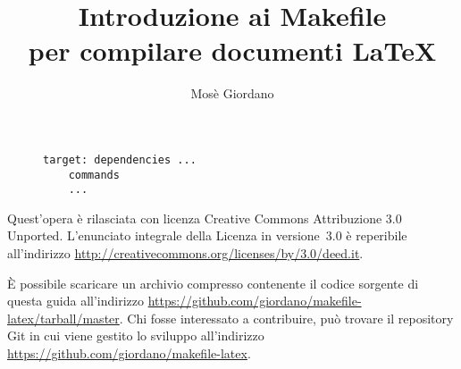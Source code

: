 \documentclass[a4paper]{article}
\title{Introduzione ai Makefile \\
  per compilare documenti \LaTeX}
\author{Mosè Giordano}
\begin{document}
\maketitle

\begin{figure}[h]
  \centering
  \begin{minipage}{0.48\linewidth}
\begin{lstlisting}
target: dependencies ...
	commands
	...
\end{lstlisting}
  \end{minipage}
\end{figure}

{\small \tableofcontents}







\printbibliography

\vfill

\noindent Quest'opera è rilasciata con licenza Creative Commons Attribuzione 3.0
Unported.  L'enunciato integrale della Licenza in versione~3.0 è reperibile
all'indirizzo \url{http://creativecommons.org/licenses/by/3.0/deed.it}.

È possibile scaricare un archivio compresso contenente il codice sorgente di
questa guida all'indirizzo
\url{https://github.com/giordano/makefile-latex/tarball/master}.  Chi fosse
interessato a contribuire, può trovare il repository Git in cui viene gestito lo
sviluppo all'indirizzo \url{https://github.com/giordano/makefile-latex}.
\end{document}
